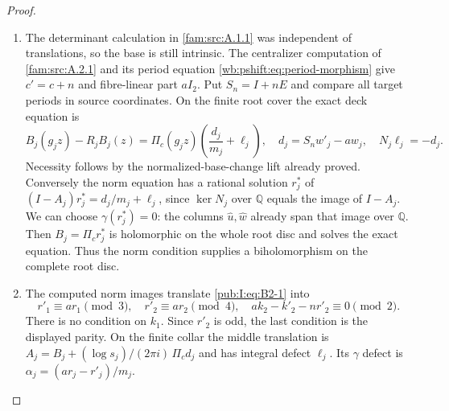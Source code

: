 \begin{proof}
\begin{enumerate}[label=\arabic*.,leftmargin=*]
\item The determinant calculation in \ref{fam:src:A.1.1} was independent of translations, so the base is still intrinsic. The centralizer computation of \cref{fam:src:A.2.1} and its period equation \eqref{wb:pshift:eq:period-morphism} give $c'=c+n$ and fibre-linear part $aI_2$. Put $S_n=I+nE$ and compare all target periods in source coordinates. On the finite root cover the exact deck equation is
\begin{equation}
 B_j(g_jz)-R_jB_j(z)=\Pi_c(g_jz)\left(\frac{d_j}{m_j}+\ell_j\right),
 \quad d_j=S_nw'_j-a w_j,
 \quad N_j\ell_j=-d_j.
\label{pub:I:eq:B2-1}
\end{equation}
Necessity follows by the normalized-base-change lift already proved. Conversely the norm equation has a rational solution $r_j^*$ of
$(I-A_j)r_j^*=d_j/m_j+\ell_j$, since $\ker N_j$ over $\mathbb Q$ equals the image of $I-A_j$. We can choose $\gamma(r_j^*)=0$: the columns $\widehat u,\widehat w$ already span that image over $\mathbb Q$. Then $B_j=\Pi_cr_j^*$ is holomorphic on the whole root disc and solves the exact equation. Thus the norm condition supplies a biholomorphism on the complete root disc.

\item The computed norm images translate \eqref{pub:I:eq:B2-1} into
\begin{equation}
 r'_1\equiv ar_1\pmod3,\quad r'_2\equiv ar_2\pmod4,
 \quad ak_2-k'_2-nr'_2\equiv0\pmod2.
\label{pub:I:eq:B2-2}
\end{equation}
There is no condition on $k_1$. Since $r'_2$ is odd, the last condition is the displayed parity. On the finite collar the middle translation is
$A_j=B_j+(\log s_j)/(2\pi i)\,\Pi_cd_j$ and has integral defect $\ell_j$. Its $\gamma$ defect is
$\alpha_j=(ar_j-r'_j)/m_j$.


\end{enumerate}
\end{proof}
